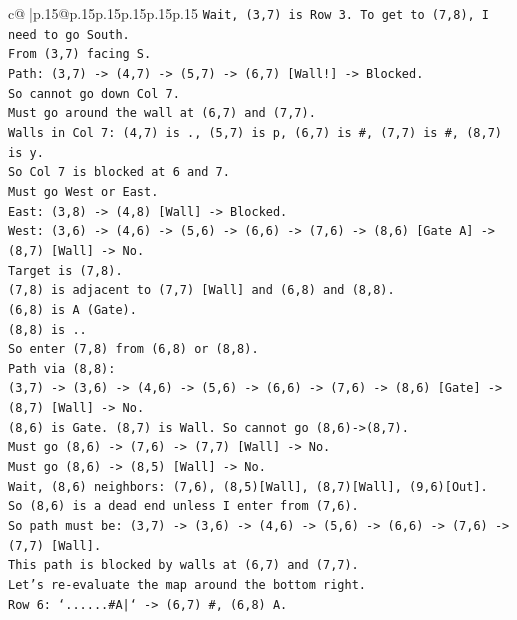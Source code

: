 \documentclass{article}
\begin{document}
{\begin{supertabular}{c@{$\;$}|p{.15\linewidth}@{}p{.15\linewidth}p{.15\linewidth}p{.15\linewidth}p{.15\linewidth}p{.15\linewidth}}
{{{\texttt{Wait, (3,7) is Row 3. To get to (7,8), I need to go South.} \\
\texttt{From (3,7) facing S.} \\
\texttt{Path: (3,7) {-}> (4,7) {-}> (5,7) {-}> (6,7) {[}Wall!{]} {-}> Blocked.} \\
\texttt{So cannot go down Col 7.} \\
\texttt{Must go around the wall at (6,7) and (7,7).} \\
\texttt{Walls in Col 7: (4,7) is ., (5,7) is p, (6,7) is \#, (7,7) is \#, (8,7) is y.} \\
\texttt{So Col 7 is blocked at 6 and 7.} \\
\texttt{Must go West or East.} \\
\texttt{East: (3,8) {-}> (4,8) {[}Wall{]} {-}> Blocked.} \\
\texttt{West: (3,6) {-}> (4,6) {-}> (5,6) {-}> (6,6) {-}> (7,6) {-}> (8,6) {[}Gate A{]} {-}> (8,7) {[}Wall{]} {-}> No.} \\
\texttt{Target is (7,8).} \\
\texttt{(7,8) is adjacent to (7,7) {[}Wall{]} and (6,8) and (8,8).} \\
\texttt{(6,8) is A (Gate).} \\
\texttt{(8,8) is ..} \\
\texttt{So enter (7,8) from (6,8) or (8,8).} \\
\texttt{Path via (8,8):} \\
\texttt{(3,7) {-}> (3,6) {-}> (4,6) {-}> (5,6) {-}> (6,6) {-}> (7,6) {-}> (8,6) {[}Gate{]} {-}> (8,7) {[}Wall{]} {-}> No.} \\
\texttt{(8,6) is Gate. (8,7) is Wall. So cannot go (8,6){-}>(8,7).} \\
\texttt{Must go (8,6) {-}> (7,6) {-}> (7,7) {[}Wall{]} {-}> No.} \\
\texttt{Must go (8,6) {-}> (8,5) {[}Wall{]} {-}> No.} \\
\texttt{Wait, (8,6) neighbors: (7,6), (8,5){[}Wall{]}, (8,7){[}Wall{]}, (9,6){[}Out{]}.} \\
\texttt{So (8,6) is a dead end unless I enter from (7,6).} \\
\texttt{So path must be: (3,7) {-}> (3,6) {-}> (4,6) {-}> (5,6) {-}> (6,6) {-}> (7,6) {-}> (7,7) {[}Wall{]}.} \\
\texttt{This path is blocked by walls at (6,7) and (7,7).} \\
\texttt{Let's re{-}evaluate the map around the bottom right.} \\
\texttt{Row 6: `......\#A|` {-}> (6,7) \#, (6,8) A.} \\
}}}
\end{supertabular}}
\end{document}
